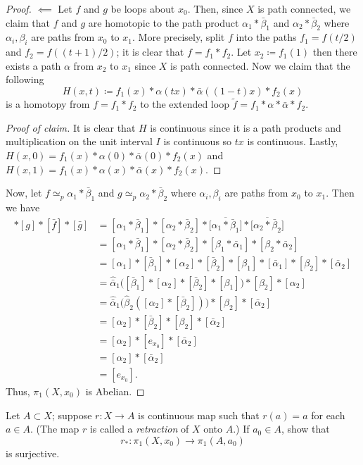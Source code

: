 \begin{proof}
$\impliedby$ Let $f$ and $g$ be loops about $x_0$. Then, since $X$ is path
connected, we claim that $f$ and $g$ are homotopic to the path product
$\alpha_1*\bar\beta_1$ and $\alpha_2*\bar\beta_2$ where $\alpha_i,\beta_i$
are paths from $x_0$ to $x_1$. More precisely, split $f$ into the paths
$f_1=f(t/2)$ and $f_2=f((t+1)/2)$; it is clear that $f=f_1*f_2$. Let
$x_2\coloneqq f_1(1)$ then there exists a path $\alpha$ from $x_2$ to $x_1$
since $X$ is path connected. Now we claim that the following
\[
H(x,t)\coloneqq f_1(x)*\alpha(tx)*\bar\alpha((1-t)x)*f_2(x)
\]
is a homotopy from $f=f_1*f_2$ to the extended loop $\tilde
f=f_1*\alpha*\bar\alpha*f_2$.
\begin{proof}[Proof of claim]
\renewcommand{\qedsymbol}{$\clubsuit$}
It is clear that $H$ is continuous since it is
a path products and multiplication on the unit interval $I$ is
continuous so $tx$ is continuous. Lastly,
$H(x,0)=f_1(x)*\alpha(0)*\bar\alpha(0)*f_2(x)$ and
$H(x,1)=f_1(x)*\alpha(x)*\bar\alpha(x)*f_2(x)$.
\end{proof}
Now, let $f\simeq_p\alpha_1*\bar\beta_1$ and
$g\simeq_p\alpha_2*\bar\beta_2$ where $\alpha_i,\beta_i$ are
paths from $x_0$ to $x_1$. Then we have
\begingroup
\allowdisplaybreaks
\begin{align*}
[f]*[g]*[\bar f]*[\bar g]
&=
[\alpha_1*\bar\beta_1]*[\alpha_2*\bar\beta_2]*
\bigl[\overline{\alpha_1*\bar\beta_1}\bigr]*
\bigl[\overline{\alpha_2*\bar\beta_2}\bigr]\\
&=
[\alpha_1*\bar\beta_1]*[\alpha_2*\bar\beta_2]*
[\beta_1*\bar\alpha_1]*[\beta_2*\bar\alpha_2]\\
&=
[\alpha_1]*[\bar\beta_1]*[\alpha_2]*[\bar\beta_2]*
[\beta_1]*[\bar\alpha_1]*[\beta_2]*[\bar\alpha_2]\\
&=\hat{\bar{\alpha}}_1\bigl([\bar\beta_1]*[\alpha_2]*[\bar\beta_2]*[\beta_1]\bigr)*[\beta_2]*[\alpha_2]\\
&=\hat{\bar{\alpha}}_1\bigl(\hat\beta_2([\alpha_2]*[\bar\beta_2])\bigr)*[\beta_2]*[\bar\alpha_2]\\
&=[\alpha_2]*[\bar\beta_2]*[\beta_2]*[\bar\alpha_2]\\
&=[\alpha_2]*[e_{x_0}]*[\bar\alpha_2]\\
&=[\alpha_2]*[\bar\alpha_2]\\
&=[e_{x_0}].
\end{align*}
\endgroup
Thus, $\pi_1(X,x_0)$ is Abelian.
\end{proof}
\newpage
\begin{problem}[Munkres \S52, Ex.\,4]
Let $A\subset X$; suppose $r\colon X\to A$ is continuous map such
that $r(a)=a$ for each $a\in A$. (The map $r$ is called a
\emph{retraction} of $X$ onto $A$.) If $a_0\in A$, show that
\[
r_*\colon\pi_1(X,x_0)\longrightarrow\pi_1(A,a_0)
\]
is surjective.
\end{problem}
